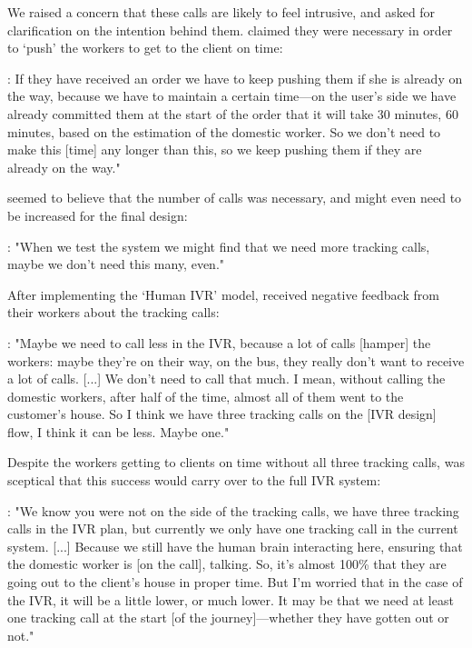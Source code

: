 We raised a concern that these calls are likely to feel intrusive, and asked for clarification on the intention behind them. \PCTwo{} claimed they were necessary in order to `push' the workers to get to the client on time: 

\begin{displayquote}
\textbf{\PCTwo{}}: If they have received an order we have to keep pushing them if she is already on the way, because we have to maintain a certain time---on the user’s side we have already committed them at the start of the order that it will take 30 minutes, 60 minutes, based on the estimation of the domestic worker. So we don’t need to make this [time] any longer than this, so we keep pushing them if they are already on the way."
\end{displayquote}

\PCOne{} seemed to believe that the number of calls was necessary, and might even need to be increased for the final design:

\begin{displayquote}
\textbf{\PCOne{}}: "When we test the system we might find that we need more tracking calls, maybe we don’t need this many, even."
\end{displayquote}

After implementing the `Human IVR' model, \PC{} received negative feedback from their workers about the tracking calls:

\begin{displayquote}
\textbf{\PCOne{}}: "Maybe we need to call less in the IVR, because a lot of calls [hamper] the workers: maybe they’re on their way, on the bus, they really don’t want to receive a lot of calls. [...] We don’t need to call that much. I mean, without calling the domestic workers, after half of the time, almost all of them went to the customer’s house. So I think we have three tracking calls on the [IVR design] flow, I think it can be less. Maybe one."
\end{displayquote}

Despite the workers getting to clients on time without all three tracking calls, \PCTwo{} was sceptical that this success would carry over to the full IVR system:

\begin{displayquote}
\textbf{\PCTwo{}}: "We know you were not on the side of the tracking calls, we have three tracking calls in the IVR plan, but currently we only have one tracking call in the current system. [...] Because we still have the human brain interacting here, ensuring that the domestic worker is [on the call], talking. So, it’s almost 100\% that they are going out to the client’s house in proper time. But I’m worried that in the case of the IVR, it will be a little lower, or much lower. It may be that we need at least one tracking call at the start [of the journey]---whether they have gotten out or not."
\end{displayquote}

